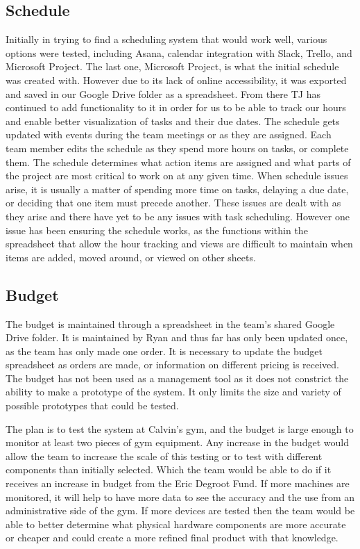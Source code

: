 \documentclass[PPFS.tex]{template/subfiles}
\begin{document}
    \subsection{Schedule}
	Initially in trying to find a scheduling system that would work well, various options were tested, including Asana, calendar integration with Slack, Trello, and Microsoft Project. The last one, Microsoft Project, is what the initial schedule was created with. However due to its lack of online accessibility, it was exported and saved in our Google Drive folder as a spreadsheet. From there TJ has continued to add functionality to it in order for us to be able to track our hours and enable better visualization of tasks and their due dates. The schedule gets updated with events during the team meetings or as they are assigned. Each team member edits the schedule as they spend more hours on tasks, or complete them. The schedule determines what action items are assigned and what parts of the project are most critical to work on at any given time. When schedule issues arise, it is usually a matter of spending more time on tasks, delaying a due date, or deciding that one item must precede another. These issues are dealt with as they arise and there have yet to be any issues with task scheduling. However one issue has been ensuring the schedule works, as the functions within the spreadsheet that allow the hour tracking and views are difficult to maintain when items are added, moved around, or viewed on other sheets. 
	
    \subsection{Budget}
    The budget is maintained through a spreadsheet in the team's shared Google Drive folder. It is maintained by Ryan and thus far has only been updated once, as the team has only made one order. It is necessary to update the budget spreadsheet as orders are made, or information on different pricing is received. The budget has not been used as a management tool as it does not constrict the ability to make a prototype of the system. It only limits the size and variety of possible prototypes that could be tested.  
    
    The plan is to test the system at Calvin's gym, and the budget is large enough to monitor at least two pieces of gym equipment. Any increase in the budget would allow the team to increase the scale of this testing or to test with different components than initially selected. Which the team would be able to do if it receives an increase in budget from the Eric Degroot Fund. If more machines are monitored, it will help to have more data to see the accuracy and the use from an administrative side of the gym. If more devices are tested then the team would be able to better determine what physical hardware components are more accurate or cheaper and could create a more refined final product with that knowledge. 
    
\end{document}
